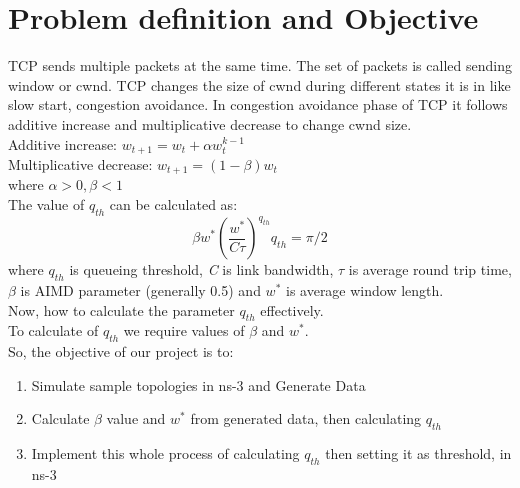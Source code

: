 \clearpage
\section{Problem definition and Objective}
TCP sends multiple packets at the same time. The set of packets is called sending window or cwnd. TCP changes the size of cwnd during different states it is in like slow start, congestion avoidance. In congestion avoidance phase of TCP it follows additive increase and multiplicative decrease to change cwnd size. \\
Additive increase: \( w_{t+1} = w_{t} + \alpha w_{t}^{k-1} \)\\
Multiplicative decrease: \( w_{t+1} = (1-\beta)w_{t}  \)\\
where \( \alpha > 0, \beta < 1 \)\\
The value of \( q_{th} \) can be calculated as: \\ 
\[
    \beta w^* \left(\frac{w^*}{C \tau}\right)^{q_{th}}{q_{th}} = \pi/2
\]
where $ q_{th} $ is queueing threshold, \textit{C} is link bandwidth, $ \tau $ is average round trip time, $ \beta $ is AIMD parameter (generally 0.5) and $ w^* $ is average window length.\\
Now, how to calculate the parameter \( q_{th} \) effectively.  \\
To calculate of $ q_{th} $ we require values of $ \beta $ and $ w^* $. \\
So, the objective of our project is to: 
\begin{enumerate}
    \item Simulate sample topologies in ns-3 and Generate Data 
    \item Calculate \( \beta \) value and $ w^* $ from generated data, then calculating \( q_{th} \) 
    \item Implement this whole process of calculating $ q_{th} $ then setting it as threshold, in ns-3 
\end{enumerate}

\clearpage

